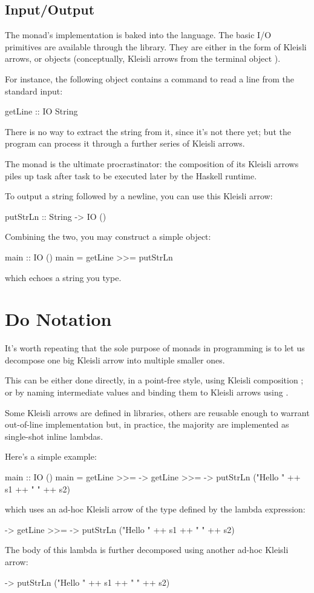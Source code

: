 \documentclass[DaoFP]{subfiles}
\begin{document}
\subsection{Input/Output}

The  monad's implementation is baked into the language. The basic I/O primitives are available through the library. They are either in the form of Kleisli arrows, or  objects (conceptually, Kleisli arrows from the terminal object \hask{()}). 

For instance, the following object contains a command to read a line from the standard input:
\begin{haskell}
getLine :: IO String
\end{haskell}
There is no way to extract the string from it, since it's not there yet; but the program can process it through a further series of Kleisli arrows. 

The  monad is the ultimate procrastinator: the composition of its Kleisli arrows piles up task after task to be executed later by the Haskell runtime.

To output a string followed by a newline, you can use this Kleisli arrow:
\begin{haskell}
putStrLn :: String -> IO ()
\end{haskell}
Combining the two, you may construct a simple  object:
\begin{haskell}
main :: IO ()
main = getLine >>= putStrLn
\end{haskell}
which echoes a string you type.

\section{Do Notation}

It's worth repeating that the sole purpose of monads in programming is to let us decompose one big Kleisli arrow into multiple smaller ones. 

This can be either done directly, in a point-free style, using Kleisli composition \hask{<=<}; or by naming intermediate values and binding them to Kleisli arrows using \hask{>>=}. 

Some Kleisli arrows are defined in libraries, others are reusable enough to warrant out-of-line implementation but, in practice, the majority are implemented as single-shot inline lambdas.

Here's a simple example:
\begin{haskell}
main :: IO ()
main = 
  getLine >>=  ->
    getLine >>=  ->
      putStrLn ("Hello " ++ s1 ++ " " ++ s2)
\end{haskell}
which uses an ad-hoc Kleisli arrow of the type  defined by the lambda expression:
\begin{haskell}
 ->
    getLine >>=  ->
      putStrLn ("Hello " ++ s1 ++ " " ++ s2)
\end{haskell}
The body of this lambda is further decomposed using another ad-hoc Kleisli arrow:
\begin{haskell}
 -> putStrLn ("Hello " ++ s1 ++ " " ++ s2)
\end{haskell}
\end{document}
